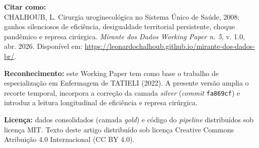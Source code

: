 \documentclass[12pt,a4paper,oneside]{article}
\begin{document}
\vspace{1cm}

\noindent\textbf{Citar como:}\\
CHALHOUB, L. Cirurgia uroginecológica no Sistema Único de Saúde,
2008: ganhos silenciosos de eficiência,
desigualdade territorial persistente, choque pandêmico e represa
cirúrgica. \textit{Mirante dos Dados
\textemdash{} Working Paper n. 5}, v. 1.0, abr. 2026.
Disponível em:
\url{https://leonardochalhoub.github.io/mirante-dos-dados-br/}.

\vspace{0.5cm}

\noindent\textbf{Reconhecimento:} este Working Paper tem como
base o trabalho de especialização em Enfermagem de TATIELI
(2022). A presente versão amplia o recorte temporal, incorpora
a correção da camada \textit{silver} (\textit{commit}
\texttt{fa869cf}) e introduz a leitura longitudinal de eficiência
e represa cirúrgica.

\vspace{0.5cm}

\noindent\textbf{Licença:} dados consolidados (camada \textit{gold})
e código do \textit{pipeline} distribuídos sob licença MIT.
Texto deste artigo distribuído sob licença Creative Commons
Atribuição 4.0 Internacional (CC BY 4.0).
\end{document}
